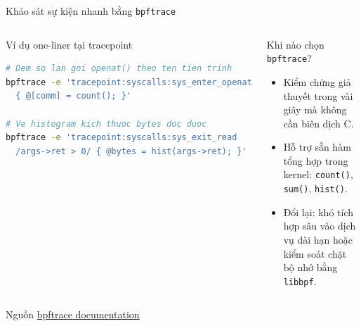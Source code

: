 \begin{frame}[fragile]{Khảo sát sự kiện nhanh bằng \texttt{bpftrace}}
  \begin{columns}[T,onlytextwidth]
    \begin{block}{Ví dụ one-liner tại tracepoint}
\begin{lstlisting}[language=bash,style=dense]
# Dem so lan goi openat() theo ten tien trinh
bpftrace -e 'tracepoint:syscalls:sys_enter_openat
  { @[comm] = count(); }'

# Ve histogram kich thuoc bytes doc duoc
bpftrace -e 'tracepoint:syscalls:sys_exit_read
  /args->ret > 0/ { @bytes = hist(args->ret); }'
\end{lstlisting}
    \end{block}

    \begin{block}{Khi nào chọn \texttt{bpftrace}?}
      \small
      \begin{itemize}
        \item Kiểm chứng giả thuyết trong vài giây mà không cần biên dịch C.
        \item Hỗ trợ sẵn hàm tổng hợp trong kernel: \texttt{count()}, \texttt{sum()}, \texttt{hist()}.
        \item Đổi lại: khó tích hợp sâu vào dịch vụ dài hạn hoặc kiểm soát chặt bộ nhớ bằng \texttt{libbpf}.
      \end{itemize}
    \end{block}
  \end{columns}
  \medskip
  {\scriptsize Nguồn \href{https://bpftrace.org/about}{bpftrace documentation}}
\end{frame}

